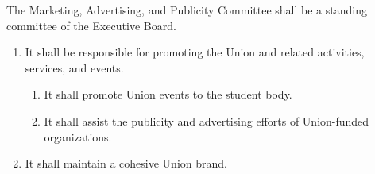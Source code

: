 \item The Marketing, Advertising, and Publicity Committee shall be a standing committee of the Executive Board. 

\begin{enumerate}

\item It shall be responsible for promoting the Union and related activities, services, and events.

\begin{enumerate}

\item It shall promote Union events to the student body.

\item It shall assist the publicity and advertising efforts of Union-funded organizations.

\end{enumerate}

\item It shall maintain a cohesive Union brand.

\end{enumerate}